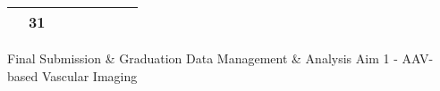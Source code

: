{\begin{tabularx}{\linewidth}{|l!{\vrule width \myLenLineThicknessThick}*{7}{@{}X@{}|}}
       & 
    
      
      
        \begin{minipage}[t]{6mm}\centering{}31\end{minipage}
      
       & 
    
      
      
       & 
    
      
      
       & 
    
      
      
       & 
    
      
      
       & 
    
      
      
      
        \\  \hline 
      
    
  
  
  \end{tabularx}
}
\vfill{\centering{} \small{Final Submission \& Graduation}\hspace{1.5em} \small{Data Management \& Analysis}\hspace{1.5em} \small{Aim 1 - AAV-based Vascular Imaging}\hspace{1.5em}\par}

